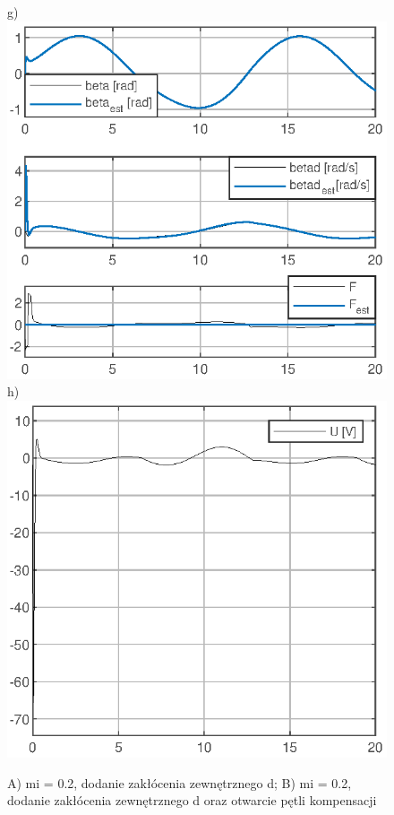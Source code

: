 \documentclass[10pt, a4paper]{article}
\begin{document}
\begin{figure}[ht]
	g) \includegraphics[width=0.22\columnwidth]{ACex6/figs/FIG3_b_tconst_dON_otwartapetla_sin_mi0.2/StateVar_dON_otwartapetla_tconst_mi0.2}
	h) \includegraphics[width=0.22\columnwidth]{ACex6/figs/FIG3_b_tconst_dON_otwartapetla_sin_mi0.2/U_dON_otwartapetla_tconst_mi0.2}\\
	\caption{A) mi = 0.2, dodanie zakłócenia zewnętrznego d; B) mi = 0.2, dodanie zakłócenia zewnętrznego d oraz otwarcie pętli kompensacji
	}
\end{figure}
\end{document}
